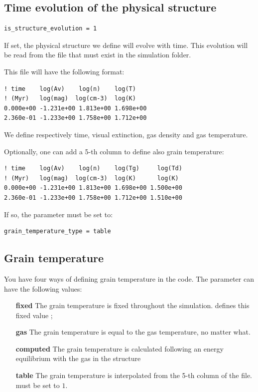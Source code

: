 \documentclass[english,a4paper,twoside]{article}
\begin{document}
\subsection{Time evolution of the physical structure}
\begin{verbatim}
is_structure_evolution = 1
\end{verbatim}

If set, the physical structure we define will evolve with time. This evolution will be read from the file  that must exist in the simulation folder. 

This file will have the following format:
\begin{verbatim}
! time    log(Av)    log(n)    log(T)
! (Myr)   log(mag)  log(cm-3)  log(K)
0.000e+00 -1.231e+00 1.813e+00 1.698e+00
2.360e-01 -1.233e+00 1.758e+00 1.712e+00
\end{verbatim}
We define respectively time, visual extinction, gas density and gas temperature. 

Optionally, one can add a 5-th column to define also grain temperature:
\begin{verbatim}
! time    log(Av)    log(n)    log(Tg)     log(Td)
! (Myr)   log(mag)  log(cm-3)  log(K)      log(K)
0.000e+00 -1.231e+00 1.813e+00 1.698e+00 1.500e+00
2.360e-01 -1.233e+00 1.758e+00 1.712e+00 1.510e+00
\end{verbatim}
If so, the parameter  must be set to:
\begin{verbatim}
grain_temperature_type = table
\end{verbatim}

\subsection{Grain temperature}
You have four ways of defining grain temperature in the code. The parameter  can have the following values:
\begin{itemize}
\item[\textbf{fixed}] The grain temperature is fixed throughout the simulation.  defines this fixed value ;
\item[\textbf{gas}] The grain temperature is equal to the gas temperature, no matter what.
\item[\textbf{computed}] The grain temperature is calculated following an energy equilibrium with the gas in the structure
\item[\textbf{table}] The grain temperature is interpolated from the 5-th column of the   file.  must be set to $1$.
\end{itemize}
\end{document}
